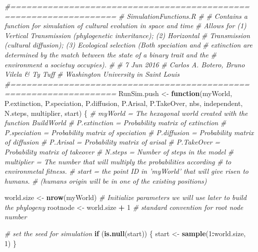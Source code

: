 \documentclass[]{book}
\newenvironment{Shaded}{\begin{snugshade}}{\end{snugshade}}
\newcommand{\KeywordTok}[1]{\textcolor[rgb]{0.13,0.29,0.53}{\textbf{{#1}}}}
\newcommand{\DecValTok}[1]{\textcolor[rgb]{0.00,0.00,0.81}{{#1}}}
\newcommand{\StringTok}[1]{\textcolor[rgb]{0.31,0.60,0.02}{{#1}}}
\newcommand{\CommentTok}[1]{\textcolor[rgb]{0.56,0.35,0.01}{\textit{{#1}}}}
\newcommand{\ControlFlowTok}[1]{\textcolor[rgb]{0.13,0.29,0.53}{\textbf{{#1}}}}
\newcommand{\OperatorTok}[1]{\textcolor[rgb]{0.81,0.36,0.00}{\textbf{{#1}}}}
\newcommand{\NormalTok}[1]{{#1}}
\theoremstyle{definition}
\theoremstyle{definition}
\theoremstyle{definition}
\theoremstyle{remark}
\begin{document}
\begin{Shaded}
\begin{Highlighting}[]
\CommentTok{#==================================================================}
\CommentTok{# SimulationFunctions.R}
\CommentTok{#}
\CommentTok{# Contains a function for simulation of cultural evolution in space and time}
\CommentTok{# Allows for (1) Vertical Transmission (phylogenetic inheritance); (2) Horizontal}
\CommentTok{# Transmission (cultural diffusion); (3) Ecological selection (Both speciation and}
\CommentTok{# extinction are determined by the match between the state of a binary trait and the}
\CommentTok{# environment a societuy occupies).}
\CommentTok{#}
\CommentTok{# 7 Jun 2016}
\CommentTok{# Carlos A. Botero, Bruno Vilela & Ty Tuff}
\CommentTok{# Washington University in Saint Louis}
\CommentTok{#==================================================================}
\NormalTok{RunSim.push <-}\StringTok{ }\ControlFlowTok{function}\NormalTok{(myWorld, P.extinction, P.speciation,}
\NormalTok{                   P.diffusion, P.Arisal, P.TakeOver, nbs, independent,}
\NormalTok{                   N.steps, multiplier, start) \{}
  \CommentTok{# myWorld = The hexagonal world created with the function BuildWorld}
  \CommentTok{# P.extinction = Probability matrix of extinction}
  \CommentTok{# P.speciation = Probability matrix of speciation}
  \CommentTok{# P.diffusion = Probability matrix of diffusion}
  \CommentTok{# P.Arisal = Probability matrix of arisal}
  \CommentTok{# P.TakeOver = Probability matrix of takeover}
  \CommentTok{# N.steps = Number of steps in the model}
  \CommentTok{# multiplier = The number that will multiply the probabilities according}
  \CommentTok{# to environmetal fitness.}
  \CommentTok{# start = the point ID in 'myWorld' that will give risen to humans.}
  \CommentTok{# (humans origin will be in one of the existing positions)}

\NormalTok{  world.size <-}\StringTok{ }\KeywordTok{nrow}\NormalTok{(myWorld)}
  \CommentTok{# Initialize parameters we will use later to build the phylogeny}
\NormalTok{  rootnode <-}\StringTok{  }\NormalTok{world.size }\OperatorTok{+}\StringTok{ }\DecValTok{1} \CommentTok{# standard convention for root node number}

  \CommentTok{# set the seed for simulation}
  \ControlFlowTok{if}\NormalTok{ (}\KeywordTok{is.null}\NormalTok{(start)) \{}
\NormalTok{    start <-}\StringTok{ }\KeywordTok{sample}\NormalTok{(}\DecValTok{1}\OperatorTok{:}\NormalTok{world.size, }\DecValTok{1}\NormalTok{)}
\NormalTok{  \}}


\end{Highlighting}
\end{Shaded}
\end{document}
